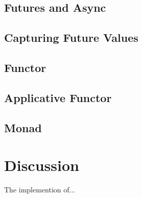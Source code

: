\documentclass[12pt,fleqn]{article}
\begin{document}
%
%
\subsection{Futures and Async}
%

\subsection{Capturing Future Values}



\subsection{Functor}


\subsection{Applicative Functor}


\subsection{Monad}



\section{Discussion}

 The implemention of...
\end{document}
